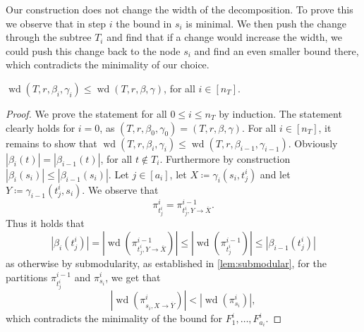 \documentclass{lmcs}
\theoremstyle{plain}\newtheorem{claim}[thm]{Claim}   %
\DeclareMathOperator{\wid}{wd}
\newcommand{\ext}{\ensuremath{\rightarrow}}
\newcommand{\complementOf}[1]{\ensuremath{\overline{#1}}}
\begin{document}
Our construction does not change the width of the decomposition.
To prove this we observe that in step $i$ the bound in $s_i$ is minimal.
We then push the change through the subtree $T_i$ and find that if a change would increase the width, we could push this change back to the node $s_i$ and find an even smaller bound there, which contradicts the minimality of our choice.

\begin{lem}
	\label{lem:width}
	$\wid(T,r,\beta_i,\gamma_i)\leq \wid(T,r,\beta,\gamma)$, for all $i\in[n_T]$.
\end{lem}

\begin{proof}
	We prove the statement for all $0\leq i\leq n_T$ by induction.
	The statement clearly holds for $i=0$, as $(T,r,\beta_0,\gamma_0)=(T,r,\beta,\gamma)$.
	For all $i\in[n_T]$, it remains to show that $\wid(T,r,\beta_i,\gamma_i)\leq \wid(T,r,\beta_{i-1},\gamma_{i-1})$.
	Obviously $|\beta_i(t)|=|\beta_{i-1}(t)|$, for all $t\notin T_i$.
	Furthermore by construction $|\beta_i(s_i)|\leq |\beta_{i-1}(s_i)|$.
	Let $j\in[a_i]$, let $X\coloneqq \gamma_i(s_i,t^i_j)$ and let $Y\coloneqq\gamma_{i-1}(t^i_j,s_i)$.
	We observe that \[\pi^{i}_{t^i_j}=\pi^{i-1}_{t^i_j,Y \ext \complementOf{X}}.\]
	Thus it holds that \[|\beta_i(t^i_j)| = |\wid(\pi^{i-1}_{t^i_j, Y \ext \complementOf{X}})| \leq |\wid(\pi^{i-1}_{t^i_j})| \leq |\beta_{i-1}(t^i_j)|\] as otherwise by submodularity, as established in \autoref{lem:submodular}, for the partitions $\pi^{i-1}_{t^i_j}$ and $\pi^i_{s_i}$, we get that \[|\wid(\pi^i_{s_i, X \ext \complementOf{Y}})| < |\wid(\pi^i_{s_i})|,\]
	which contradicts the minimality of the bound for $F^i_1,\ldots,F^i_{a_i}$.
	

\end{proof}
\end{document}
